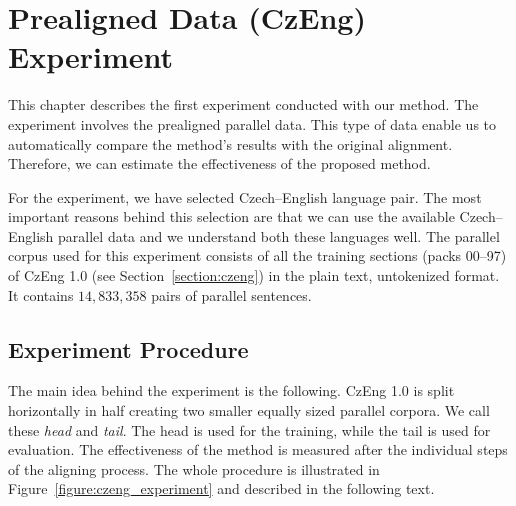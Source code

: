 
\chapter{Prealigned Data (CzEng) Experiment}
\label{chapter:prealigned_data_czeng_experiment}

This chapter describes the first experiment conducted with our method. The experiment involves the prealigned parallel data. This type of data enable us to automatically compare the method's results with the original alignment. Therefore, we can estimate the effectiveness of the proposed method.

For the experiment, we have selected Czech--English language pair. The most important reasons behind this selection are that we can use the available Czech--English parallel data and we understand both these languages well. The parallel corpus used for this experiment consists of all the training sections (packs 00--97) of CzEng 1.0 (see Section~\ref{section:czeng}) in the plain text, untokenized format. It contains $14,833,358$ pairs of parallel sentences.

\section{Experiment Procedure}
\label{section:czeng_experiment_procedure}

The main idea behind the experiment is the following. CzEng 1.0 is split horizontally in half creating two smaller equally sized parallel corpora. We call these \textit{head} and \textit{tail}. The head is used for the training, while the tail is used for evaluation. The effectiveness of the method is measured after the individual steps of the aligning process. The whole procedure is illustrated in Figure~\ref{figure:czeng_experiment} and described in the following text.

